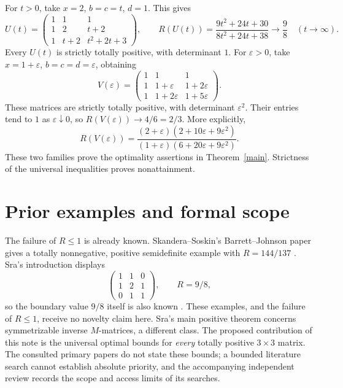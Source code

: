 \documentclass[11pt]{article}
\begin{document}
For $t>0$, take $x=2$, $b=c=t$, $d=1$. This gives
\[
 U(t)=\begin{pmatrix}1&1&1\\1&2&t+2\\1&t+2&t^2+2t+3\end{pmatrix},
 \qquad R(U(t))=\frac{9t^2+24t+30}{8t^2+24t+38}\longrightarrow\frac98
 \quad(t\longrightarrow\infty).
\]
Every $U(t)$ is strictly totally positive, with determinant $1$.
For $\varepsilon>0$, take $x=1+\varepsilon$, $b=c=d=\varepsilon$, obtaining
\[
 V(\varepsilon)=\begin{pmatrix}
 1&1&1\\1&1+\varepsilon&1+2\varepsilon\\
 1&1+2\varepsilon&1+5\varepsilon
 \end{pmatrix}.
\]
These matrices are strictly totally positive, with determinant
$\varepsilon^2$. Their entries tend to $1$ as $\varepsilon\downarrow0$,
so $R(V(\varepsilon))\to4/6=2/3$. More explicitly,
\[
 R(V(\varepsilon))=
 \frac{(2+\varepsilon)(2+10\varepsilon+9\varepsilon^2)}
 {(1+\varepsilon)(6+20\varepsilon+9\varepsilon^2)}.
\]
These two families prove the optimality assertions in Theorem~\ref{main}.
Strictness of the universal inequalities proves nonattainment.

\section{Prior examples and formal scope}
The failure of $R\le1$ is already known. Skandera--Soskin's
Barrett--Johnson paper gives a totally nonnegative, positive semidefinite
example with $R=144/137$ \cite[\S6]{SSBJ}. Sra's introduction displays
\[
 \begin{pmatrix}1&1&0\\1&2&1\\0&1&1\end{pmatrix},\qquad R=9/8,
\]
so the boundary value $9/8$ itself is also known \cite{Sra}.
These examples, and the failure of $R\le1$, receive no novelty claim here.
Sra's main positive theorem concerns symmetrizable inverse $M$-matrices,
a different class. The proposed contribution of this note is the universal
optimal bounds for \emph{every} totally positive $3\times3$ matrix.
The consulted primary papers do not state these bounds; a bounded
literature search cannot establish absolute priority, and the accompanying independent review records the scope and access limits
of its searches.
\end{document}
